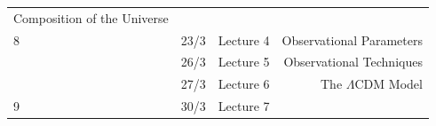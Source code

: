 \documentclass[11pt,a4paper]{book}
\begin{document}
\begin{longtable}[]{@{}llcr@{}}
\begin{minipage}[t]{0.55\columnwidth}
Composition of the Universe\strut
\end{minipage}\tabularnewline
\begin{minipage}[t]{0.05\columnwidth}\raggedright
8\strut
\end{minipage} & \begin{minipage}[t]{0.09\columnwidth}\raggedright
23/3\strut
\end{minipage} & \begin{minipage}[t]{0.19\columnwidth}\centering
Lecture 4\strut
\end{minipage} & \begin{minipage}[t]{0.55\columnwidth}\raggedleft
Observational Parameters\strut
\end{minipage}\tabularnewline
\begin{minipage}[t]{0.05\columnwidth}\raggedright
\strut
\end{minipage} & \begin{minipage}[t]{0.09\columnwidth}\raggedright
26/3\strut
\end{minipage} & \begin{minipage}[t]{0.19\columnwidth}\centering
Lecture 5\strut
\end{minipage} & \begin{minipage}[t]{0.55\columnwidth}\raggedleft
Observational Techniques\strut
\end{minipage}\tabularnewline
\begin{minipage}[t]{0.05\columnwidth}\raggedright
\strut
\end{minipage} & \begin{minipage}[t]{0.09\columnwidth}\raggedright
27/3\strut
\end{minipage} & \begin{minipage}[t]{0.19\columnwidth}\centering
Lecture 6\strut
\end{minipage} & \begin{minipage}[t]{0.55\columnwidth}\raggedleft
The \(\Lambda\)CDM Model\strut
\end{minipage}\tabularnewline
\begin{minipage}[t]{0.05\columnwidth}\raggedright
9\strut
\end{minipage} & \begin{minipage}[t]{0.09\columnwidth}\raggedright
30/3\strut
\end{minipage} & \begin{minipage}[t]{0.19\columnwidth}\centering
Lecture 7\strut
\end{minipage} & \begin{minipage}[t]{0.55\columnwidth}\raggedleft

\end{minipage}
\end{longtable}
\end{document}
